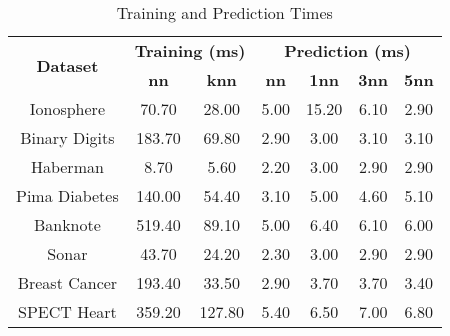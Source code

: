 \begin{table}[htbp]
\caption{Training and Prediction Times}
\begin{center}
\begin{tabular}{|c|c|c|c|c|c|c|}
\hline
\multirow{2}{*}{\textbf{Dataset}} & \multicolumn{2}{c|}{\textbf{Training (ms)}} & \multicolumn{4}{c|}{\textbf{Prediction (ms)}} \\ \cline{2-7}
 & \textbf{nn} & \textbf{knn} & \textbf{nn} & \textbf{1nn} & \textbf{3nn} & \textbf{5nn} \\ \hline
Ionosphere & 70.70 & 28.00 & 5.00 & 15.20 & 6.10 & 2.90 \\ \hline
Binary Digits & 183.70 & 69.80 & 2.90 & 3.00 & 3.10 & 3.10 \\ \hline
Haberman & 8.70 & 5.60 & 2.20 & 3.00 & 2.90 & 2.90 \\ \hline
Pima Diabetes & 140.00 & 54.40 & 3.10 & 5.00 & 4.60 & 5.10 \\ \hline
Banknote & 519.40 & 89.10 & 5.00 & 6.40 & 6.10 & 6.00 \\ \hline
Sonar & 43.70 & 24.20 & 2.30 & 3.00 & 2.90 & 2.90 \\ \hline
Breast Cancer & 193.40 & 33.50 & 2.90 & 3.70 & 3.70 & 3.40 \\ \hline
SPECT Heart & 359.20 & 127.80 & 5.40 & 6.50 & 7.00 & 6.80 \\ \hline
\end{tabular}
\label{tab:timing}
\end{center}
\end{table}